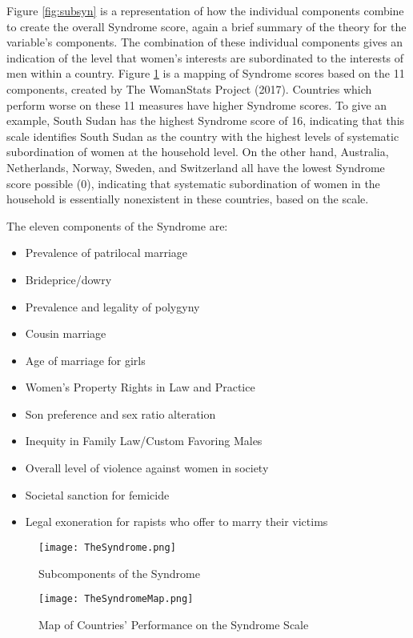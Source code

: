 Figure \ref{fig:subsyn} is a representation of how the individual components combine to create the overall Syndrome score, again a brief summary of the theory for the variable's components. The combination of these individual components gives an indication of the level that women's interests are subordinated to the interests of men within a country. Figure \ref{fig:synmap} is a mapping of Syndrome scores based on the 11 components, created by The WomanStats Project (2017). Countries which perform worse on these 11 measures have higher Syndrome scores. To give an example, South Sudan has the highest Syndrome score of 16, indicating that this scale identifies South Sudan as the country with the highest levels of systematic subordination of women at the household level. On the other hand, Australia, Netherlands, Norway, Sweden, and Switzerland all have the lowest Syndrome score possible (0), indicating that systematic subordination of women in the household is essentially nonexistent in these countries, based on the scale.  

The eleven components of the Syndrome are:

\begin{itemize}
\item Prevalence of patrilocal marriage
\item Brideprice/dowry
\item Prevalence and legality of polygyny
\item Cousin marriage
\item Age of marriage for girls
\item Women’s Property Rights in Law and Practice
\item Son preference and sex ratio alteration
\item Inequity in Family Law/Custom Favoring Males
\item Overall level of violence against women in society
\item Societal sanction for femicide
\item Legal exoneration for rapists who offer to marry their victims
\end{itemize}

\begin{figure}
\centering
\begin{minipage}{.45\textwidth}
\renewcommand\thefigure{1.1}
  \begin{centering}
  \texttt{[image: TheSyndrome.png]}
  \end{centering}
  \caption{Subcomponents of the \newline Syndrome}
  \label{fig:subsyn}
\end{minipage}%
\begin{minipage}{.50\textwidth}
\renewcommand\thefigure{1.2}
  \centering
  \texttt{[image: TheSyndromeMap.png]}
  \caption{Map of Countries' Performance on the Syndrome Scale}
  \label{fig:synmap}
\end{minipage}
\end{figure}


